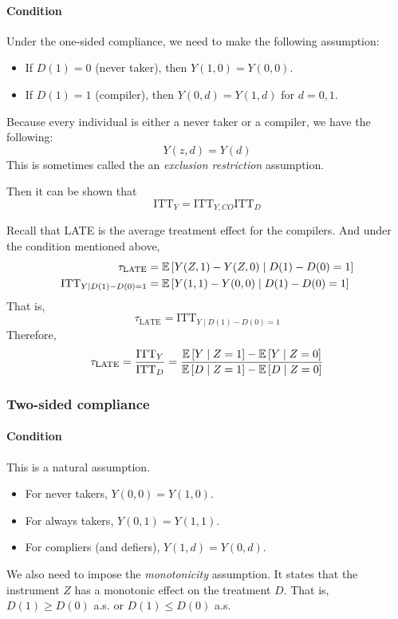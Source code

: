 \paragraph{Condition}
Under the one-sided compliance, we need to make the following assumption:
\begin{itemize}
    \item If $D(1)=0$ (never taker), then $Y(1,0)=Y(0,0)$.
    \item If $D(1)=1$ (compiler), then $Y(0,d)=Y(1,d)$ for $d=0,1$.
\end{itemize} 
Because every individual is either a never taker or a compiler, we have the following:$$Y(z,d)=Y(d)$$ This is sometimes called the an \textit{exclusion restriction} assumption.

Then it can be shown that \begin{equation*}
    \text{ITT}_Y = \text{ITT}_{Y,CO}\text{ITT}_D
\end{equation*}

Recall that LATE is the average treatment effect for the compilers. And under the condition mentioned above, 
\begin{align*}
    \tau_{\text{LATE}} &= \mathbb{E}\left[Y(Z,1)-Y(Z,0)\mid D(1)-D(0)=1\right]\\
    \text{ITT}_{Y\mid {D(1)-D(0)=1}}&=\mathbb{E}\left[Y(1,1)-Y(0,0)\mid D(1)-D(0)=1\right]
\end{align*}
That is, \begin{equation*}
    \tau_{\text{LATE}} = \text{ITT}_{Y\mid {D(1)-D(0)=1}}
\end{equation*}
Therefore,
\begin{equation*}
\tau_{\text{LATE}} = \frac{\text{ITT}_Y}{\text{ITT}_D} =  \frac{\mathbb{E}\left[Y \mid Z=1\right]-\mathbb{E}\left[Y\mid Z=0\right]}{\mathbb{E}\left[D\mid Z=1\right]-\mathbb{E}\left[D\mid Z=0\right]}
\end{equation*}

\subsubsection{Two-sided compliance}
\paragraph{Condition} This is a natural assumption. 
\begin{itemize} 
    \item For never takers, $Y(0,0)=Y(1,0)$.
    \item For always takers, $Y(0,1)=Y(1,1)$.
    \item For compliers (and defiers), $Y(1,d)=Y(0,d)$.
\end{itemize}
We also need to impose the \emph{monotonicity} assumption. It states that the instrument $Z$ has a monotonic effect on the treatment $D$. That is, $D(1)\ge D(0)$ a.s. or $D(1)\le D(0)$ a.s.

